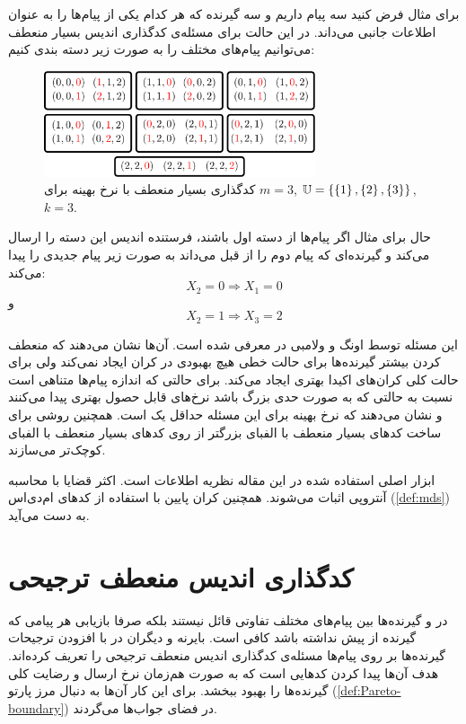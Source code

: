 برای مثال فرض کنید سه پیام داریم و سه گیرنده که هر کدام یکی از پیام‌ها را به عنوان اطلاعات جانبی می‌داند. در این حالت برای مسئله‌ی کدگذاری اندیس بسیار منعطف می‌توانیم پیام‌های مختلف را به صورت زیر دسته بندی کنیم:
\begin{figure}[H]
	\centering
	\includegraphics[width=8cm]{figs/chapter4/Alpha3}
	\caption[
	مثالی از کدگذاری بسیار منعطف با نرخ بهینه
	]{
		کدگذاری بسیار منعطف با نرخ بهینه برای
		$m=3$, 
		$\mathbb{U} = \left\{  \left\{ 1 \right\}, \left\{ 2 \right\}, \left\{ 3 \right\} \right\}$,
		$k=3$.
	}
	\label{fig:eg:0}
\end{figure}
حال برای مثال اگر پیام‌ها از دسته اول باشند، فرستنده اندیس این دسته را ارسال می‌کند و گیرنده‌ای که پیام دوم را از قبل می‌داند به صورت زیر پیام جدیدی را پیدا می‌کند:
$$X_2 = 0 \Rightarrow X_1 = 0$$
و
$$X_2 = 1 \Rightarrow X_3 = 2$$


این مسئله توسط اونگ و ولامبی در
\cite{verypliable}
معرفی شده است. آن‌ها نشان می‌دهند که منعطف کردن بیشتر گیرنده‌ها برای حالت خطی هیچ بهبودی در کران ایجاد نمی‌کند ولی برای حالت کلی کران‌های اکیدا بهتری ایجاد می‌کند. برای حالتی که اندازه پیام‌ها متناهی است نسبت به حالتی که به صورت حدی بزرگ باشد نرخ‌های قابل حصول بهتری پیدا می‌کنند و  نشان می‌دهند که نرخ بهینه برای این مسئله حداقل یک است. همچنین روشی برای ساخت کدهای بسیار منعطف با الفبای بزرگتر از روی کدهای بسیار منعطف با الفبای کوچک‌تر می‌سازند.

ابزار اصلی استفاده شده در این مقاله نظریه اطلاعات است. اکثر قضایا با محاسبه آنتروپی اثبات می‌شوند. همچنین کران پایین با استفاده از
 کدهای ام‌دی‌اس (\autoref{def:mds}) به دست می‌آید.


\section{کدگذاری اندیس منعطف ترجیحی}
در 
\icod
 و 
 \picod
 گیرنده‌ها بین پیام‌های مختلف تفاوتی قائل نیستند بلکه صرفا بازیابی هر پیامی که گیرنده از پیش نداشته باشد کافی است. بایرنه و دیگران در
\cite{byrne2023preferential}
با افزودن ترجیحات گیرنده‌ها بر روی پیام‌ها مسئله‌ی کدگذاری اندیس منعطف ترجیحی را تعریف کرده‌اند. هدف آن‌ها پیدا کردن کدهایی است که به صورت هم‌زمان نرخ ارسال و رضایت کلی گیرنده‌ها را بهبود ببخشد. برای این کار آن‌ها به دنبال مرز پارتو (\autoref{def:Pareto-boundary})
 در فضای جواب‌ها می‌گردند.
 
